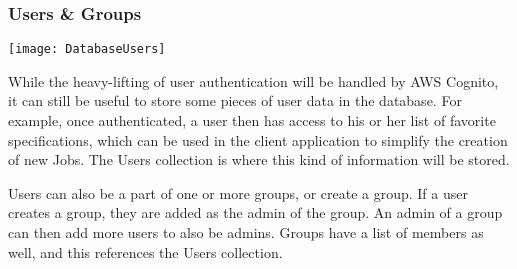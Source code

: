\subsubsection{Users \& Groups}
\begin{center}
  \texttt{[image: DatabaseUsers]} \\[12pt]
\end{center}
While the heavy-lifting of user authentication will be handled by AWS Cognito, it can still be useful to store some pieces of user data in the database. For example, once authenticated, a user then has access to his or her list of favorite specifications, which can be used in the client application to simplify the creation of new Jobs. The Users collection is where this kind of information will be stored.\par
Users can also be a part of one or more groups, or create a group. If a user creates a group, they are added as the admin of the group. An admin of a group can then add more users to also be admins. Groups have a list of members as well, and this references the Users collection.\par
